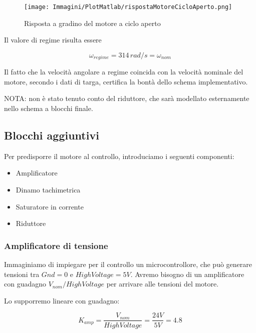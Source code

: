 \documentclass[a4paper,12pt]{article}
\begin{document}
\vspace{0.3cm}

\begin{figure}[h!]
\centering
    \texttt{[image: Immagini/PlotMatlab/rispostaMotoreCicloAperto.png]} 
    \caption{Risposta a gradino del motore a ciclo aperto}
    \label{fig: ciclo aperto}
\end{figure}

\vspace{0.5cm}

Il valore di regime risulta essere 

\[
    \omega_{regime}= 314\,rad/s=\omega_{nom}
\]
\vspace{0.3cm}

Il fatto che la velocità angolare a regime coincida con la velocità nominale del motore, secondo i dati di targa, certifica la bontà dello schema implementativo.

NOTA: non è stato tenuto conto del riduttore, che sarà modellato esternamente nello schema a blocchi finale.


\subsection{Blocchi aggiuntivi}


Per predisporre il motore al controllo, introduciamo i seguenti componenti:

\begin{itemize}
    \item Amplificatore
    \item Dinamo tachimetrica
    \item Saturatore in corrente
    \item Riduttore
\end{itemize}

\subsubsection{Amplificatore di tensione}

Immaginiamo di impiegare per il controllo un microcontrollore, che può generare tensioni tra $Gnd = 0$ e $HighVoltage = 5V$. Avremo bisogno di un amplificatore con guadagno $V_{nom}/HighVoltage$ per arrivare alle tensioni del motore.

Lo supporremo lineare con guadagno:

\vspace{0.3cm}

\[
    K_{amp} = \frac{V_{nom}}{HighVoltage} = \frac{24V}{5V}=4.8
\]
\end{document}
